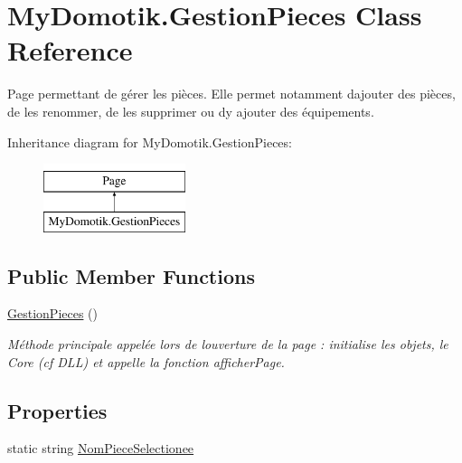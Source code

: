 \hypertarget{class_my_domotik_1_1_gestion_pieces}{}\section{My\+Domotik.\+Gestion\+Pieces Class Reference}
\label{class_my_domotik_1_1_gestion_pieces}


Page permettant de gérer les pièces. Elle permet notamment d\textquotesingle{}ajouter des pièces, de les renommer, de les supprimer ou d\textquotesingle{}y ajouter des équipements.  


Inheritance diagram for My\+Domotik.\+Gestion\+Pieces\+:\begin{figure}[H]
\begin{center}
\leavevmode
\includegraphics[height=2.000000cm]{class_my_domotik_1_1_gestion_pieces}
\end{center}
\end{figure}
\subsection*{Public Member Functions}
\begin{DoxyCompactItemize}
\item 
\hyperlink{class_my_domotik_1_1_gestion_pieces_a8ebf7bb45ced4d6fec2c9c756487c217}{Gestion\+Pieces} ()
\begin{DoxyCompactList}\small\item\em Méthode principale appelée lors de l\textquotesingle{}ouverture de la page \+: initialise les objets, le Core (cf D\+LL) et appelle la fonction afficher\+Page. \end{DoxyCompactList}\end{DoxyCompactItemize}
\subsection*{Properties}
\begin{DoxyCompactItemize}
\item 
static string \hyperlink{class_my_domotik_1_1_gestion_pieces_a67a89cb8b8c4baa3b965c1e0cd991d0f}{Nom\+Piece\+Selectionee}
\end{DoxyCompactItemize}


